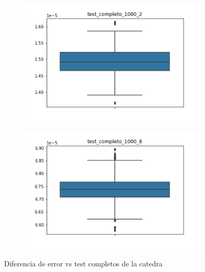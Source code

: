 \begin{figure}
\begin{subfigure}{.5\textwidth}
\end{subfigure}%
\begin{subfigure}{.5\textwidth}
  \centering
  \includegraphics[width=\linewidth]{imagenes/test_completo_1000_2.png}
\end{subfigure}
\begin{subfigure}{.5\textwidth}
  \centering
  \includegraphics[width=\linewidth]{imagenes/test_completo_1000_8.png}
\end{subfigure}
\caption{Diferencia de error vs test completos de la catedra}
\label{fig:testCatedra}
\end{figure}

\FloatBarrier
